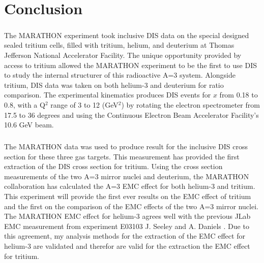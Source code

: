 
\chapter{Conclusion}
\paragraph{}The MARATHON experiment took inclusive DIS data on the special designed sealed tritium cells, filled with tritium, helium, and deuterium at Thomas Jefferson National Accelerator Facility. The unique opportunity provided by access to tritium allowed the MARATHON experiment to be the first to use DIS to study the internal structurer of this radioactive A=3 system. Alongside tritium, DIS data was taken on both helium-3 and deuterium for ratio comparison. The experimental kinematics produces DIS events for $x$ from 0.18 to 0.8, with a Q$^2$ range of 3 to 12 (GeV$^2$) by rotating the electron spectrometer from 17.5 to 36 degrees and using the Continuous Electron Beam Accelerator Facility's 10.6 GeV beam. 
\paragraph{}The MARATHON data was used to produce result for the inclusive DIS cross section for these three gas targets. This measurement has provided the first extraction of the DIS cross section for tritium. Using the cross section measurements of the two A=3 mirror nuclei and deuterium, the MARATHON collaboration has calculated the A=3 EMC effect for both helium-3 and tritium. This experiment will provide the first ever results on the EMC effect of tritium and the first on the comparison of the EMC effects of the two A=3 mirror nuclei. The MARATHON EMC effect for helium-3 agrees well with the previous JLab EMC measurement from experiment E03103 J. Seeley and A. Daniels \cite{seeley}. Due to this agreement, my analysis methods for the extraction of the EMC effect for helium-3 are validated and therefor are valid for the extraction the EMC effect for tritium. 
